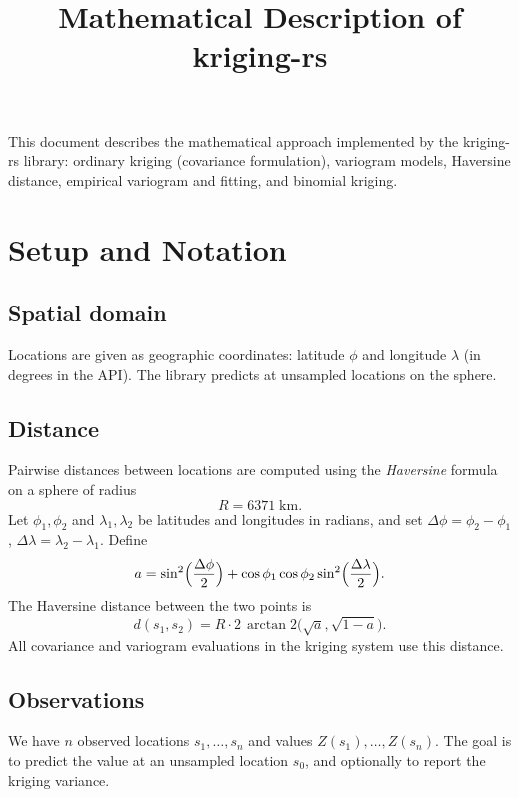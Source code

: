 \documentclass[11pt]{article}
\title{Mathematical Description of kriging-rs}
\author{}
\date{}
\begin{document}
\maketitle

This document describes the mathematical approach implemented by the kriging-rs library: ordinary kriging (covariance formulation), variogram models, Haversine distance, empirical variogram and fitting, and binomial kriging.

\section{Setup and Notation}

\subsection{Spatial domain}
Locations are given as geographic coordinates: latitude $\phi$ and longitude $\lambda$ (in degrees in the API). The library predicts at unsampled locations on the sphere.

\subsection{Distance}
Pairwise distances between locations are computed using the \emph{Haversine} formula on a sphere of radius
\begin{equation}
  R = 6371 \;\text{km}.
\end{equation}
Let $\phi_1,\phi_2$ and $\lambda_1,\lambda_2$ be latitudes and longitudes in radians, and set $\Delta\phi = \phi_2 - \phi_1$, $\Delta\lambda = \lambda_2 - \lambda_1$. Define
\begin{equation}
  a = \sin^2\Bigl(\frac{\Delta\phi}{2}\Bigr) + \cos\phi_1 \cos\phi_2 \sin^2\Bigl(\frac{\Delta\lambda}{2}\Bigr).
\end{equation}
The Haversine distance between the two points is
\begin{equation}
  d(s_1, s_2) = R \cdot 2\,\arctan2\bigl(\sqrt{a}, \sqrt{1-a}\bigr).
\end{equation}
All covariance and variogram evaluations in the kriging system use this distance.

\subsection{Observations}
We have $n$ observed locations $s_1, \ldots, s_n$ and values $Z(s_1), \ldots, Z(s_n)$. The goal is to predict the value at an unsampled location $s_0$, and optionally to report the kriging variance.
\end{document}
